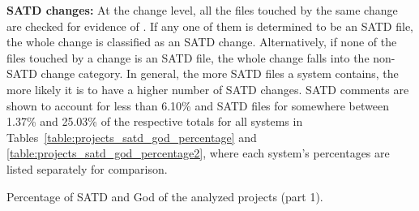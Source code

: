 \noindent\textbf{SATD changes:}
At the change level, all the files touched by the same change are checked for evidence of \SATD. If any one of them is determined to be an SATD file, the whole change is classified as an SATD change. Alternatively, if none of the files touched by a change is an SATD file, the whole change falls into the non-SATD change category. In general, the more SATD files a system contains, the more likely it is to have a higher number of SATD changes. SATD comments are shown to account for less than 6.10\% and SATD files for somewhere between 1.37\% and 25.03\% of the respective totals for all systems in Tables~\ref{table:projects_satd_god_percentage} and \ref{table:projects_satd_god_percentage2}, where each system's percentages are listed separately for comparison.

\begin{landscape}
	
	
	\begin{table}[htbp]
		\small
		\centering
		\caption{Percentage of SATD and God of the analyzed projects (part 1).}
		\begin{adjustbox}{width=1.0\textwidth}
			

\end{adjustbox}
\end{table}
\end{landscape}
